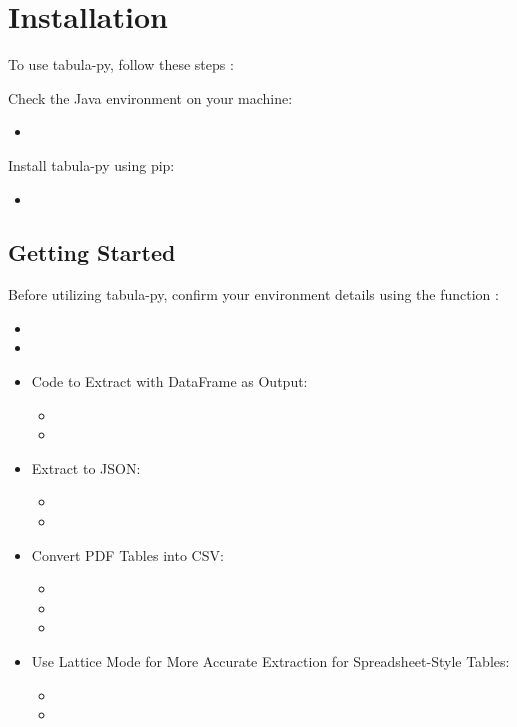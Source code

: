 \section{Installation}

To use tabula-py, follow these steps \cite{Ariga:2024}:

Check the Java environment on your machine:
\begin{itemize}
\item[] 
\end{itemize}
Install tabula-py using pip:
\begin{itemize}
\item[] 
\end{itemize}

\subsection{Getting Started}
Before utilizing tabula-py, confirm your environment details using the function  \cite{Ariga:2024}:
\begin{itemize}
\item[] 
\item[] 
\end{itemize}

\begin{itemize}
\item Code to Extract with DataFrame as Output:
\begin{itemize}
\item[] 
\item[] 
\end{itemize}

\item Extract to JSON:
\begin{itemize}
\item[] 
\item[] 
\end{itemize}

\item Convert PDF Tables into CSV:
\begin{itemize}
\item[] 
\item[] 
\item[] 
\end{itemize}

\item Use Lattice Mode for More Accurate Extraction for Spreadsheet-Style Tables:
\begin{itemize}
\item[] 
\item[] 
\end{itemize}
\end{itemize}

